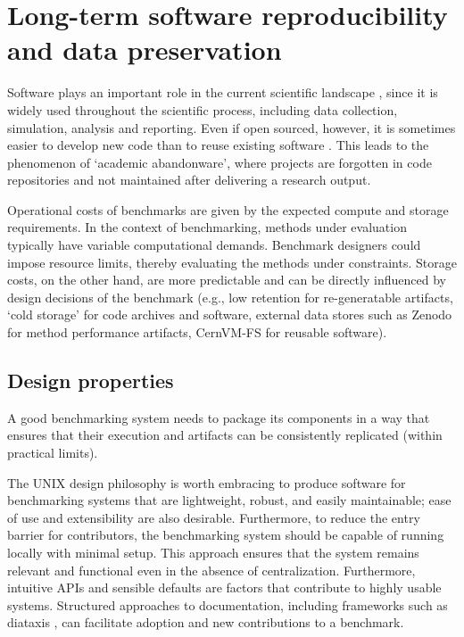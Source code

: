 \documentclass[11pt]{article}
\begin{document}
\section*{Long-term software reproducibility and data preservation}

Software plays an important role in the current scientific landscape \cite{Howison2015-rc}, since it is widely used throughout the scientific process, including data collection, simulation, analysis and reporting. Even if open sourced, however, it is sometimes easier to develop new code than to reuse existing software \cite{Trisovic2022-ol}. This leads to the phenomenon of `academic abandonware', where projects are forgotten in code repositories and not maintained after delivering a research output.

Operational costs of benchmarks are given by the expected compute and storage requirements. In the context of benchmarking, methods under evaluation typically have variable computational demands. Benchmark designers could impose resource limits, thereby evaluating the methods under constraints. Storage costs, on the other hand, are more predictable and can be directly influenced by design decisions of the benchmark (e.g., low retention for re-generatable artifacts, `cold storage' for code archives and software, external data stores such as Zenodo for method performance artifacts, CernVM-FS for reusable software).

\subsection*{Design properties}

A good benchmarking system needs to package its components in a way that ensures that their execution and artifacts can be consistently replicated (within practical limits).

The UNIX design philosophy \cite{Pike1984-we} is worth embracing to produce software for benchmarking systems that are lightweight, robust, and easily maintainable; ease of use and extensibility are also desirable. Furthermore, to reduce the entry barrier for contributors, the benchmarking system should be capable of running locally with minimal setup. This approach ensures that the system remains relevant and functional even in the absence of centralization. Furthermore, intuitive APIs and sensible defaults \cite{Proctor2018-do} are factors that contribute to highly usable systems. Structured approaches to documentation, including frameworks such as diataxis \cite{ProcidaUnknown-vf}, can facilitate adoption and new contributions to a benchmark.
\end{document}
